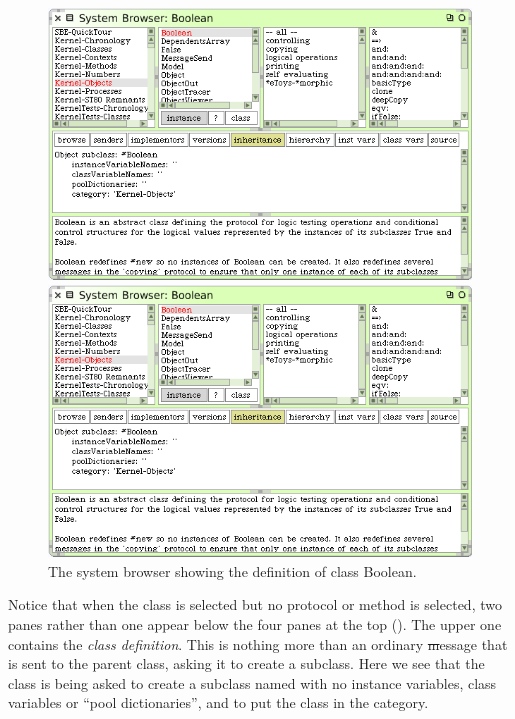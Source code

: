 \documentclass[a4paper,10pt,twoside]{book}
\begin{document}
\begin{figure}[hbt]
\ifluluelse
	{\centerline {\includegraphics[width=\textwidth]{Kernel-objects-boolean}}}
	{\centerline {\includegraphics[scale=0.7]{Kernel-objects-boolean}}}
\caption{The system browser showing the definition of class Boolean.
\label{fig:browseBoolean}}
\end{figure}

Notice that when the  class is selected but no protocol or method is selected, two panes rather than one appear below the four panes at the top
().
The upper one contains the \emph{class definition}.
This is nothing more than an ordinary \st message that is sent to the parent class, asking it to create a subclass.
Here we see that the class  is being asked to create a subclass named  with no instance variables, class variables or ``pool dictionaries'', and to put the class  in the  category.
\end{document}
